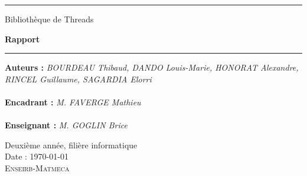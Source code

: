 \thispagestyle{empty}

\hrule
\begin{flushleft}
\Huge{Bibliothèque de Threads}\\
\end{flushleft}
\begin{flushright}
\huge\textbf{Rapport}\\
\end{flushright}
\hrule

\noindent\textbf{Auteurs :}
\emph{BOURDEAU Thibaud, DANDO Louis-Marie, HONORAT Alexandre, RINCEL Guillaume, SAGARDIA Elorri}\\
\\
\noindent\textbf{Encadrant :}
\emph{M. FAVERGE Mathieu}\\
\\
\noindent\textbf{Enseignant :}
\emph{M. GOGLIN Brice} 

\normalsize
\begin{center}
  Deuxième année, filière informatique\\
  Date : \today\\
  \textsc{Enseirb-Matmeca}
\end{center}
